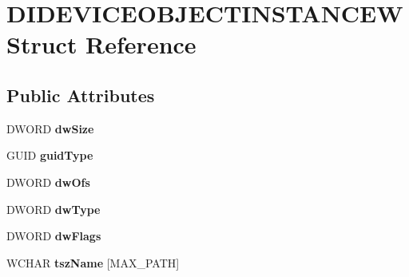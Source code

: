 \hypertarget{struct_d_i_d_e_v_i_c_e_o_b_j_e_c_t_i_n_s_t_a_n_c_e_w}{\section{D\-I\-D\-E\-V\-I\-C\-E\-O\-B\-J\-E\-C\-T\-I\-N\-S\-T\-A\-N\-C\-E\-W Struct Reference}
\label{struct_d_i_d_e_v_i_c_e_o_b_j_e_c_t_i_n_s_t_a_n_c_e_w}
}
\subsection*{Public Attributes}
\begin{DoxyCompactItemize}
\item 
\hypertarget{struct_d_i_d_e_v_i_c_e_o_b_j_e_c_t_i_n_s_t_a_n_c_e_w_a2fbed541278941e86c3fbf11dfd297c3}{D\-W\-O\-R\-D {\bfseries dw\-Size}}\label{struct_d_i_d_e_v_i_c_e_o_b_j_e_c_t_i_n_s_t_a_n_c_e_w_a2fbed541278941e86c3fbf11dfd297c3}

\item 
\hypertarget{struct_d_i_d_e_v_i_c_e_o_b_j_e_c_t_i_n_s_t_a_n_c_e_w_a4c152079b03b9562a5b47a646733b6df}{G\-U\-I\-D {\bfseries guid\-Type}}\label{struct_d_i_d_e_v_i_c_e_o_b_j_e_c_t_i_n_s_t_a_n_c_e_w_a4c152079b03b9562a5b47a646733b6df}

\item 
\hypertarget{struct_d_i_d_e_v_i_c_e_o_b_j_e_c_t_i_n_s_t_a_n_c_e_w_a2b28e87efeab1ed1f566beac50e79ed9}{D\-W\-O\-R\-D {\bfseries dw\-Ofs}}\label{struct_d_i_d_e_v_i_c_e_o_b_j_e_c_t_i_n_s_t_a_n_c_e_w_a2b28e87efeab1ed1f566beac50e79ed9}

\item 
\hypertarget{struct_d_i_d_e_v_i_c_e_o_b_j_e_c_t_i_n_s_t_a_n_c_e_w_ad9c4bdb5203844e414f92775912f304d}{D\-W\-O\-R\-D {\bfseries dw\-Type}}\label{struct_d_i_d_e_v_i_c_e_o_b_j_e_c_t_i_n_s_t_a_n_c_e_w_ad9c4bdb5203844e414f92775912f304d}

\item 
\hypertarget{struct_d_i_d_e_v_i_c_e_o_b_j_e_c_t_i_n_s_t_a_n_c_e_w_a42adc48f109981061c6f876b847d15f7}{D\-W\-O\-R\-D {\bfseries dw\-Flags}}\label{struct_d_i_d_e_v_i_c_e_o_b_j_e_c_t_i_n_s_t_a_n_c_e_w_a42adc48f109981061c6f876b847d15f7}

\item 
\hypertarget{struct_d_i_d_e_v_i_c_e_o_b_j_e_c_t_i_n_s_t_a_n_c_e_w_a845aa8a8663e0891936d076c086d9b03}{W\-C\-H\-A\-R {\bfseries tsz\-Name} \mbox{[}M\-A\-X\-\_\-\-P\-A\-T\-H\mbox{]}}\label{struct_d_i_d_e_v_i_c_e_o_b_j_e_c_t_i_n_s_t_a_n_c_e_w_a845aa8a8663e0891936d076c086d9b03}


\end{DoxyCompactItemize}
